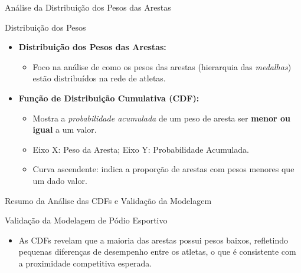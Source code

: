 
\begin{frame}{Análise da Distribuição dos Pesos das Arestas}
    \begin{block}{Distribuição dos Pesos}
        \begin{itemize}
            \item \textbf{Distribuição dos Pesos das Arestas:} 
            \begin{itemize}
                \item Foco na análise de como os pesos das arestas (hierarquia das \textit{medalhas}) estão distribuídos na rede de atletas.
            \end{itemize}
            \item \textbf{Função de Distribuição Cumulativa (CDF):}
            \begin{itemize}
                \item Mostra a \textit{probabilidade acumulada} de um peso de aresta ser \textbf{menor ou igual} a um valor.
                \item Eixo X: Peso da Aresta; Eixo Y: Probabilidade Acumulada.
                \item Curva ascendente: indica a proporção de arestas com pesos menores que um dado valor.
            \end{itemize}
        \end{itemize}
    \end{block}
\end{frame}







\begin{frame}{Resumo da Análise das CDFs e Validação da Modelagem}
    \begin{block}{Validação da Modelagem de Pódio Esportivo}
        \begin{itemize}
            \item As CDFs revelam que a maioria das arestas possui pesos baixos, refletindo pequenas diferenças de desempenho entre os atletas, o que é consistente com a proximidade competitiva esperada.
        \end{itemize}
    \end{block}
    
    
\end{frame}

